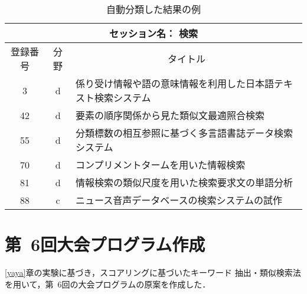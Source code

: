\begin{table*}
\begin{center}
\caption[表]{\label{99nlp}自動分類した結果の例}
\footnotesize 
\begin{tabular}{|c|c|l|}\hline 
\multicolumn{3}{|c|}{\bf セッション名： 検索} \\\hline
登録番号& 分野 & \multicolumn{1}{|c|}{タイトル}\\\hline
  3 & d  & 係り受け情報や語の意味情報を利用した日本語テキスト検索システム \\\hline
  42 & d  & 要素の順序関係から見た類似文最適照合検索 \\\hline
  55 & d  & 分類標数の相互参照に基づく多言語書誌データ検索システム \\\hline
  70 & d  & コンプリメントタームを用いた情報検索 \\\hline
  81 & d  & 情報検索の類似尺度を用いた検索要求文の単語分析 \\\hline
  88 & c  & ニュース音声データベースの検索システムの試作 \\\hline 
\end{tabular}
\end{center}
\end{table*}

\section{第\ 6回大会プログラム作成} 
\label{gogo}
\ref{yaya}章の実験に基づき，スコアリングに基づいたキーワード
抽出・類似検索法を用いて，第\ 6回の大会プログラムの原案を作成した．


